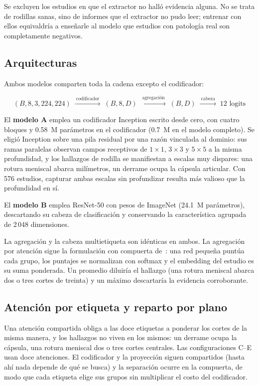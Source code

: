 \documentclass{article}
\begin{document}
Se excluyen los estudios en que el extractor no halló evidencia alguna. No se
trata de rodillas sanas, sino de informes que el extractor no pudo leer;
entrenar con ellos equivaldría a enseñarle al modelo que estudios con patología
real son completamente negativos.

\subsection{Arquitecturas}

Ambos modelos comparten toda la cadena excepto el codificador:

\begin{equation*}
(B, 8, 3, 224, 224)
\;\xrightarrow{\ \text{codificador}\ }\; (B, 8, D)
\;\xrightarrow{\ \text{agregación}\ }\; (B, D)
\;\xrightarrow{\ \text{cabeza}\ }\; 12 \text{ logits}
\end{equation*}

El \textbf{modelo A} emplea un codificador Inception escrito desde cero, con
cuatro bloques y 0.58~M parámetros en el codificador (0.7~M en el modelo
completo). Se eligió Inception sobre una pila residual por una razón vinculada al
dominio: sus ramas paralelas observan campos receptivos de $1\times1$, $3\times3$
y $5\times5$ a la misma profundidad, y los hallazgos de rodilla se manifiestan a
escalas muy dispares: una rotura meniscal abarca milímetros, un derrame ocupa
la cápsula articular. Con 576 estudios, capturar ambas escalas sin profundizar
resulta más valioso que la profundidad en sí.

El \textbf{modelo B} emplea ResNet-50 con pesos de ImageNet (24.1~M parámetros),
descartando su cabeza de clasificación y conservando la característica agrupada
de 2\,048 dimensiones.

La agregación y la cabeza multietiqueta son idénticas en ambos. La agregación por
atención sigue la formulación con compuerta de~\citet{ilse2018attention}: una red
pequeña puntúa cada grupo, los puntajes se normalizan con softmax y el embedding
del estudio es su suma ponderada. Un promedio diluiría el hallazgo (una rotura
meniscal abarca dos o tres cortes de treinta) y un máximo descartaría la
evidencia corroborante.

\subsection{Atención por etiqueta y reparto por plano}
\label{sec:por-caras}

Una atención compartida obliga a las doce etiquetas a ponderar los cortes de la
misma manera, y los hallazgos no viven en los mismos: un derrame ocupa la
cápsula, una rotura meniscal dos o tres cortes centrales. Las configuraciones
C--E usan doce atenciones. El codificador y la proyección siguen compartidos
(hasta ahí nada depende de qué se busca) y la separación ocurre en la
compuerta, de modo que cada etiqueta elige sus grupos sin multiplicar el costo
del codificador.
\end{document}
